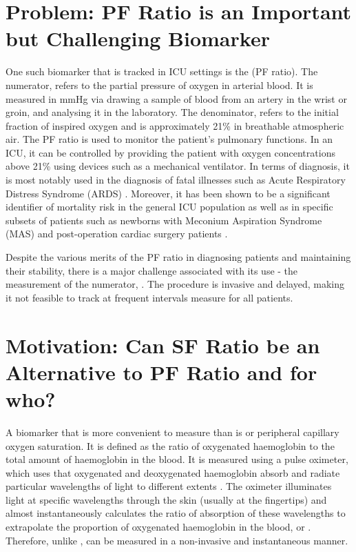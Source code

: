 \section{Problem: PF Ratio is an Important but Challenging Biomarker}

One such biomarker that is tracked in ICU settings is the  \PF(PF ratio). The numerator, \Pa refers to the partial pressure of oxygen in arterial blood. It is measured in mmHg via drawing a sample of blood from an artery in the wrist or groin, and analysing it in the laboratory. The denominator, \Fi refers to the initial fraction of inspired oxygen and is approximately 21\% in breathable atmospheric air. The PF ratio is used to monitor the patient's pulmonary functions. In an ICU, it can be controlled by providing the patient with oxygen concentrations above 21\% using devices such as a mechanical ventilator. In terms of diagnosis, it is most notably used in the diagnosis of fatal illnesses such as Acute Respiratory Distress Syndrome (ARDS) \citep{bernard1994american}. Moreover, it has been shown to be a significant identifier of mortality risk in the general ICU population \citep{villar2011risk} as well as in specific subsets of patients such as newborns with Meconium Aspiration Syndrome (MAS)  \citep{narayanan2019pao2} and post-operation cardiac surgery patients \citep{esteve2014evaluation}.

Despite the various merits of the PF ratio in diagnosing patients and maintaining their stability, there is a major challenge associated with its use - the measurement of the numerator, \Pa. The  procedure is invasive and delayed, making it not feasible to track \Pa at frequent intervals measure for all patients. 


\section{Motivation: Can SF Ratio be an Alternative to PF Ratio and for who?}
A biomarker that is more convenient to measure than \Pa is \Sp or peripheral capillary oxygen saturation. It is defined as the ratio of oxygenated haemoglobin to the total amount of haemoglobin in the blood. It is measured using a pulse oximeter, which uses that oxygenated and deoxygenated haemoglobin absorb and radiate particular wavelengths of light to different extents \citep{jubran1999pulse} . The oximeter illuminates light at specific wavelengths through the skin (usually at the fingertips) and almost instantaneously calculates the ratio of absorption of these wavelengths to extrapolate the proportion of oxygenated haemoglobin in the blood, or \Sp \citep{jubran2015}. Therefore, unlike \Pa, \Sp can be measured in a non-invasive and instantaneous manner. 

